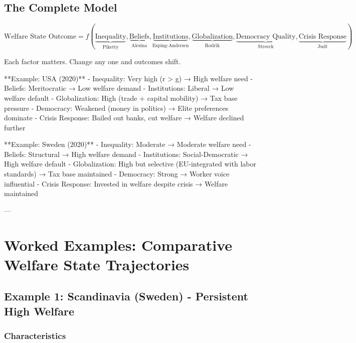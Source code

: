 \subsection{The Complete Model}

\begin{equation}
\boxed{\text{Welfare State Outcome} = f(\underbrace{\text{Inequality}}_{\text{Piketty}}, \underbrace{\text{Beliefs}}_{\text{Alesina}}, \underbrace{\text{Institutions}}_{\text{Esping-Andersen}}, \underbrace{\text{Globalization}}_{\text{Rodrik}}, \underbrace{\text{Democracy Quality}}_{\text{Streeck}}, \underbrace{\text{Crisis Response}}_{\text{Judt}})}
\end{equation}

Each factor matters. Change any one and outcomes shift.

**Example: USA (2020)**
- Inequality: Very high (r > g) → High welfare need
- Beliefs: Meritocratic → Low welfare demand
- Institutions: Liberal → Low welfare default
- Globalization: High (trade + capital mobility) → Tax base pressure
- Democracy: Weakened (money in politics) → Elite preferences dominate
- Crisis Response: Bailed out banks, cut welfare → Welfare declined further

**Example: Sweden (2020)**
- Inequality: Moderate → Moderate welfare need
- Beliefs: Structural → High welfare demand
- Institutions: Social-Democratic → High welfare default
- Globalization: High but selective (EU-integrated with labor standards) → Tax base maintained
- Democracy: Strong → Worker voice influential
- Crisis Response: Invested in welfare despite crisis → Welfare maintained

---

\clearpage


\section{Worked Examples: Comparative Welfare State Trajectories}
\label{sec:examples}

\subsection{Example 1: Scandinavia (Sweden) - Persistent High Welfare}

\subsubsection{Characteristics}

